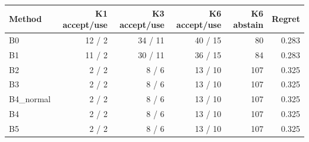 \begin{tabular}{lrrrrr}\toprule
Method & K1 accept/use & K3 accept/use & K6 accept/use & K6 abstain & Regret\\\midrule
B0 & 12 / 2 & 34 / 11 & 40 / 15 & 80 & 0.283\\
B1 & 11 / 2 & 30 / 11 & 36 / 15 & 84 & 0.283\\
B2 & 2 / 2 & 8 / 6 & 13 / 10 & 107 & 0.325\\
B3 & 2 / 2 & 8 / 6 & 13 / 10 & 107 & 0.325\\
B4\_normal & 2 / 2 & 8 / 6 & 13 / 10 & 107 & 0.325\\
B4 & 2 / 2 & 8 / 6 & 13 / 10 & 107 & 0.325\\
B5 & 2 / 2 & 8 / 6 & 13 / 10 & 107 & 0.325\\
\bottomrule\end{tabular}

